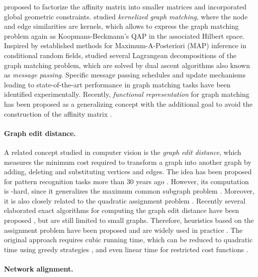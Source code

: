 \documentclass{article}
\begin{document}
\citet{Zhou/DeLaTorre/2016} proposed to factorize the affinity matrix into smaller matrices and incorporated global geometric constraints.
\citet{Zhang/etal/2019} studied \emph{kernelized graph matching}, where the node and edge similarities are kernels, which allows to express the graph matching problem again as Koopmans-Beckmann's QAP in the associated Hilbert space.
Inspired by established methods for Maximum-A-Posteriori (MAP) inference in conditional random fields, \citet{Swoboda/etal/2017} studied several Lagrangean decompositions of the graph matching problem, which are solved by dual ascent algorithms also known as \emph{message passing}.
Specific message passing schedules and update mechanisms leading to state-of-the-art performance in graph matching tasks have been identified experimentally.
Recently, \emph{functional representation} for graph matching has been proposed as a generalizing concept with the additional goal to avoid the construction of the affinity matrix \citep{Wang/etal/2019b}.

\paragraph{Graph edit distance.}

A related concept studied in computer vision is the \emph{graph edit distance}, which measures the minimum cost required to transform a graph into another graph by adding, deleting and substituting vertices and edges.
The idea has been proposed for pattern recognition tasks more than 30 years ago \citep{Sanfeliu/Fu/1983}.
However, its computation is -hard, since it generalizes the maximum common subgraph problem \citep{Bunke/1997}.
Moreover, it is also closely related to the quadratic assignment problem \citep{Bougleux/etal/2017}.
Recently several elaborated exact algorithms for computing the graph edit distance have been proposed \citep{Gouda/Hassaan/2016,Lerouge/etal/2017,Chen/etal/2019}, but are still limited to small graphs.
Therefore, heuristics based on the assignment problem have been proposed \citep{Riesen/Bunke/2009} and are widely used in practice \citep{Stauffer/etal/2017}.
The original approach requires cubic running time, which can be reduced to quadratic time using greedy strategies \citep{Riesen/etal/2015b,Riesen/etal/2015}, and even linear time for restricted cost functions \citep{Kriege/etal/2019a}.

\paragraph{Network alignment.}
\end{document}
